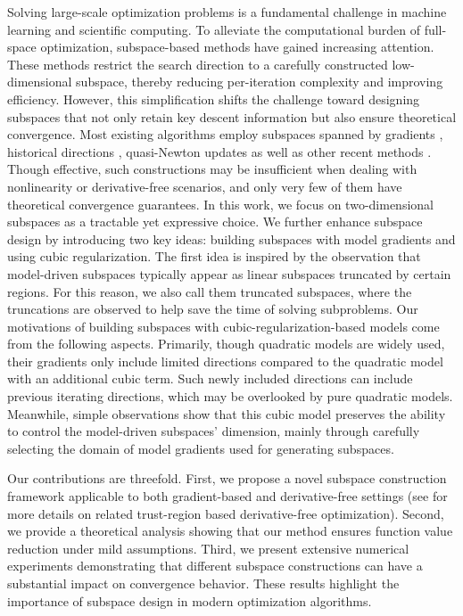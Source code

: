 \documentclass[colorlinks=true, linkcolor=blue, citecolor=blue, urlcolor=blue]{article}
\theoremstyle{plain}
\theoremstyle{definition}
\theoremstyle{remark}
\begin{document}
Solving large-scale optimization problems is a fundamental challenge in machine learning and scientific computing. To alleviate the computational burden of full-space optimization, subspace-based methods have gained increasing attention. These methods restrict the search direction to a carefully constructed low-dimensional subspace, thereby reducing per-iteration complexity and improving efficiency. However, this simplification shifts the challenge toward designing subspaces that not only retain key descent information but also ensure theoretical convergence. 
Most existing algorithms employ subspaces spanned by gradients \cite{Yuan_Stoer_1995,zhang2023drsomdimensionreducedsecondorder,zhang2025scalablederivativefreeoptimizationalgorithms}, historical directions \cite{Arnold2023,xie2024newtwodimensionalmodelbasedsubspace}, quasi-Newton updates \cite{gower2019rsnrandomizedsubspacenewton,cartis2022randomisedsubspacegaussnewtonmethod} as well as other recent methods \cite{1artis2025randomsubspacecubicregularizationmethods,1chen2024q,1hare2025expected,1tansley2025scalablesecondorderoptimizationalgorithms,1You_2016_CVPR,dzahini2025noiseawarescalablesubspaceclassical, Cartis2023}. Though effective, such constructions may be insufficient when dealing with nonlinearity or derivative-free scenarios, and only very few of them have theoretical convergence guarantees. In this work, we focus on two-dimensional subspaces as a tractable yet expressive choice. We further enhance subspace design by introducing two key ideas: building subspaces with model gradients and using cubic regularization. The first idea is inspired by the observation that model-driven subspaces typically appear as linear subspaces truncated by certain regions. For this reason, we also call them truncated subspaces, where the truncations are observed to help save the time of solving subproblems. Our motivations of building subspaces with cubic-regularization-based models come from the following aspects. Primarily, though quadratic models are widely used, their gradients only include limited directions compared to the quadratic model with an additional cubic term. Such newly included directions can include previous iterating directions, which may be overlooked by pure quadratic models. Meanwhile, simple observations show that this cubic model preserves the ability to control the model-driven subspaces' dimension, mainly through carefully selecting the domain of model gradients used for generating subspaces. 

Our contributions are threefold. First, we propose a novel subspace construction framework applicable to both gradient-based and derivative-free settings (see \cite{xie2023dfoto,xie2025remuregionalminimalupdating,xieh2,xieyuannew,Conn2009,Alarie2020} for more details on related trust-region based derivative-free optimization). Second, we provide a theoretical analysis showing that our method ensures function value reduction under mild assumptions. Third, we present extensive numerical experiments demonstrating that different subspace constructions can have a substantial impact on convergence behavior. These results highlight the importance of subspace design in modern optimization algorithms.
\end{document}
